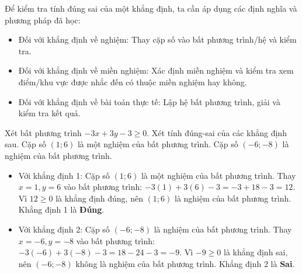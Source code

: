 \begin{emcobiet}
Để kiểm tra tính đúng sai của một khẳng định, ta cần áp dụng các định nghĩa và phương pháp đã học:
\begin{itemize}
    \item Đối với khẳng định về nghiệm: Thay cặp số vào bất phương trình/hệ và kiểm tra.
    \item Đối với khẳng định về miền nghiệm: Xác định miền nghiệm và kiểm tra xem điểm/khu vực được nhắc đến có thuộc miền nghiệm hay không.
    \item Đối với khẳng định về bài toán thực tế: Lập hệ bất phương trình, giải và kiểm tra kết quả.
\end{itemize}
Xét bất phương trình $-3x + 3y - 3 \ge 0$. Xét tính đúng-sai của các khẳng định sau.
\choiceTF
{ \True Cặp số $(1; 6)$ là một nghiệm của bất phương trình. }
{ \False Cặp số $(-6; -8)$ là nghiệm của bất phương trình. }
\begin{itemize}
    \item Với khẳng định 1: Cặp số $(1; 6)$ là một nghiệm của bất phương trình.
    Thay $x=1, y=6$ vào bất phương trình: $-3(1) + 3(6) - 3 = -3 + 18 - 3 = 12$.
    Vì $12 \ge 0$ là khẳng định đúng, nên $(1; 6)$ là nghiệm của bất phương trình. Khẳng định 1 là \textbf{Đúng}.
    \item Với khẳng định 2: Cặp số $(-6; -8)$ là nghiệm của bất phương trình.
    Thay $x=-6, y=-8$ vào bất phương trình: $-3(-6) + 3(-8) - 3 = 18 - 24 - 3 = -9$.
    Vì $-9 \ge 0$ là khẳng định sai, nên $(-6; -8)$ không là nghiệm của bất phương trình. Khẳng định 2 là \textbf{Sai}.
\end{itemize}
\end{emcobiet}
